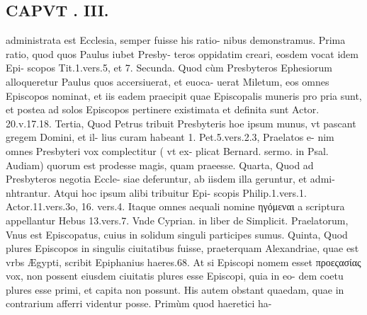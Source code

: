 \documentclass{article}
\begin{document}
\begin{pages}
\section*{CAPVT . III. }
\marginpar{[ p.95 ]}\pstart administrata est Ecclesia, semper fuisse his ratio- nibus demonstramus.  \pend\pstart Prima ratio, quod quos Paulus iubet Presby- teros oppidatim creari, eosdem vocat idem Epi- scopos Tit.1.vers.5, et 7.  \pend\pstart Secunda. Quod cùm Presbyteros Ephesiorum alloqueretur Paulus quos accersiuerat, et euoca- uerat Miletum, eos omnes Episcopos nominat, et iis eadem praecipit quae Episcopalis muneris pro pria sunt, et postea ad solos Episcopos pertinere existimata et definita sunt Actor. 20.v.17.18.  \pend\pstart Tertia, Quod Petrus tribuit Presbyteris hoe ipsum munus, vt pascant gregem Domini, et il- lius curam habeant 1. Pet.5.vers.2.3, Praelatos e- nim omnes Presbyteri vox complectitur ( vt ex- plicat Bernard. sermo. in Psal. Audiam) quorum est prodesse magis, quam praeesse.  \pend\pstart Quarta, Quod ad Presbyteros negotia Eccle- siae deferuntur, ab iisdem illa geruntur, et admi- nhtrantur. Atqui hoc ipsum alibi tribuitur Epi- scopis Philip.1.vers.1. Actor.11.vers.3o, 16. vers.4. Itaque omnes aequali nomine ηγόμεναι a scriptura appellantur Hebus 13.vers.7. Vnde Cyprian. in liber  de Simplicit. Praelatorum, Vnus est Episcopatus, cuius in solidum singuli participes sumus.  \pend\pstart Quinta, Quod plures Episcopos in singulis ciuitatibus fuisse, praeterquam Alexandriae, quae est vrbs Ægypti, scribit Epiphanius haeres.68. At si Episcopi nomem esset προεςασίας vox, non possent eiusdem ciuitatis plures esse Episcopi, quia in eo- dem coetu plures esse primi, et capita non possunt.  \pend\pstart His autem obstant quaedam, quae in contrarium afferri videntur posse. Primùm quod haeretici ha-  \pend

\end{pages}
\end{document}
